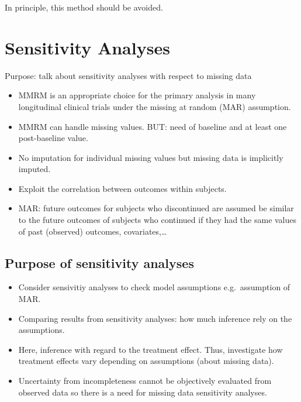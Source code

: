 \documentclass[
  letterpaper,
  DIV=11,
  numbers=noendperiod]{scrreprt}
\providecommand{\tightlist}{%
  \setlength{\itemsep}{0pt}\setlength{\parskip}{0pt}}\usepackage{longtable,booktabs,array}
\begin{document}
In principle, this method should be avoided.


\hypertarget{sensitivity-analyses}{%
\chapter{Sensitivity Analyses}\label{sensitivity-analyses}}

Purpose: talk about sensitivity analyses with respect to missing data

\begin{itemize}
\tightlist
\item
  MMRM is an appropriate choice for the primary analysis in many
  longitudinal clinical trials under the missing at random (MAR)
  assumption.
\item
  MMRM can handle missing values. BUT: need of baseline and at least one
  post-baseline value.
\item
  No imputation for individual missing values but missing data is
  implicitly imputed.
\item
  Exploit the correlation between outcomes within subjects.
\item
  MAR: future outcomes for subjects who discontinued are assumed be
  similar to the future outcomes of subjects who continued if they had
  the same values of past (observed) outcomes, covariates,\ldots{}
\end{itemize}

\hypertarget{purpose-of-sensitivity-analyses}{%
\section{Purpose of sensitivity
analyses}\label{purpose-of-sensitivity-analyses}}

\begin{itemize}
\tightlist
\item
  Consider sensivitiy analyses to check model assumptions
  e.g.~assumption of MAR.
\item
  Comparing results from sensitivity analyses: how much inference rely
  on the assumptions.
\item
  Here, inference with regard to the treatment effect. Thus, investigate
  how treatment effects vary depending on assumptions (about missing
  data).
\item
  Uncertainty from incompleteness cannot be objectively evaluated from
  observed data so there is a need for missing data sensitivity
  analyses.
\end{itemize}
\end{document}
